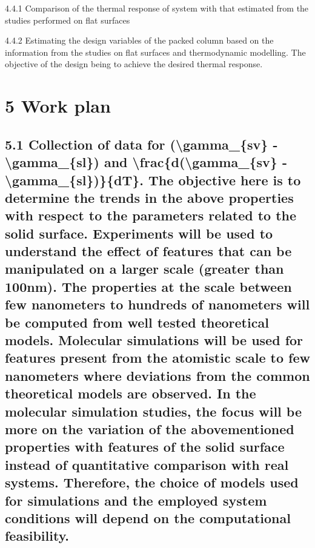 \par 4.4.1 Comparison of the thermal response of system with that estimated from the studies performed on flat surfaces
\par 4.4.2 Estimating the design variables of the packed column based on the information from the studies on flat surfaces and thermodynamic modelling. The objective of the design being to achieve the desired thermal response.\section{5 Work plan}
\subsection{5.1 Collection of data for (\textbackslash gamma\_\{sv\} - \textbackslash gamma\_\{sl\}) and \textbackslash frac\{d(\textbackslash gamma\_\{sv\} - \textbackslash gamma\_\{sl\})\}\{dT\}. The objective here is to determine the trends in the above properties with respect to the parameters related to the solid surface. Experiments will be used to understand the effect of features that can be manipulated on a larger scale (greater than 100nm). The properties at the scale between few nanometers to hundreds of nanometers will be computed from well tested theoretical models. Molecular simulations will be used for features present from the atomistic scale to few nanometers where deviations from the common theoretical models are observed. In the molecular simulation studies, the focus will be more on the variation of the abovementioned properties with features of the solid surface instead of quantitative comparison with real systems. Therefore, the choice of models used for simulations and the employed system conditions will depend on the computational feasibility.}

